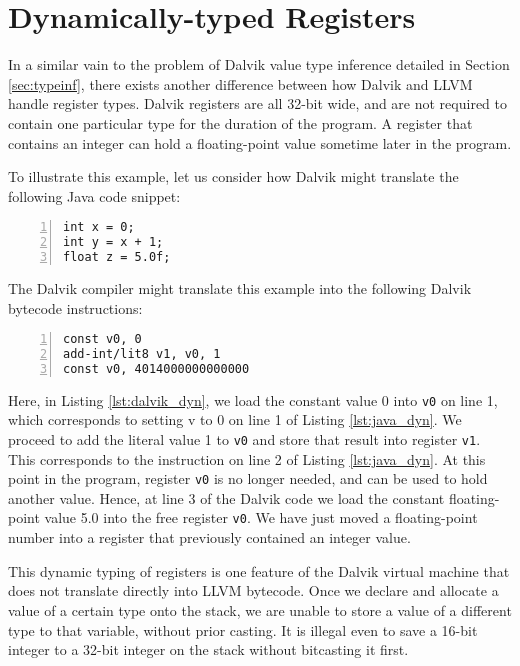 \section{Dynamically-typed Registers}
\label{sec:dyntype}

In a similar vain to the problem of Dalvik value type inference detailed in Section \ref{sec:typeinf}, there exists another difference between how Dalvik and LLVM handle register types. Dalvik registers are all 32-bit wide, and are not required to contain one particular type for the duration of the program. A register that contains an integer can hold a floating-point value sometime later in the program. 

To illustrate this example, let us consider how Dalvik might translate the following Java code snippet:

\lstset{
	language=Java,
	basicstyle=\small,
	stringstyle=\ttfamily
}

\begin{lstlisting}[frame=single, numbers=left, numberstyle=\tiny, caption={Java code}, label=lst:java_dyn]
int x = 0;
int y = x + 1;
float z = 5.0f;
\end{lstlisting}

The Dalvik compiler might translate this example into the following Dalvik bytecode instructions:


\lstset{
	language=Assembly,
	basicstyle=\small,
	stringstyle=\ttfamily
}

\begin{lstlisting}[frame=single, numbers=left, numberstyle=\tiny, caption={Dalvik bytecode}, label=lst:dalvik_dyn]
const v0, 0
add-int/lit8 v1, v0, 1
const v0, 4014000000000000
\end{lstlisting}

Here, in Listing \ref{lst:dalvik_dyn}, we load the constant value 0 into \verb|v0| on line 1, which corresponds to setting v to 0 on line 1 of Listing \ref{lst:java_dyn}. We proceed to add the literal value 1 to \verb|v0| and store that result into register \verb|v1|. This corresponds to the instruction on line 2 of Listing \ref{lst:java_dyn}. At this point in the program, register \verb|v0| is no longer needed, and can be used to hold another value. Hence, at line 3 of the Dalvik code we load the constant floating-point value 5.0 into the free register \verb|v0|. We have just moved a floating-point number into a register that previously contained an integer value.

This dynamic typing of registers is one feature of the Dalvik virtual machine that does not translate directly into LLVM bytecode. Once we declare and allocate a value of a certain type onto the stack, we are unable to store a value of a different type to that variable, without prior casting. It is illegal even to save a 16-bit integer to a 32-bit integer on the stack without bitcasting it first.

